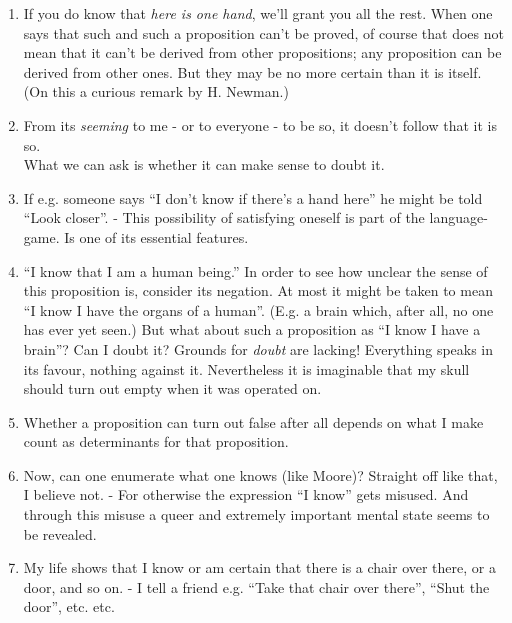 \documentclass{book}
\begin{document}
\mainmatter

\begin{enumerate}

\item
If you do know that \emph{here is one hand}, we'll grant you all the rest.
When one says that such and such a proposition can't be proved, of course that
does not mean that it can't be derived from other propositions; any proposition
can be derived from other ones. But they may be no more certain than it is
itself. (On this a curious remark by H. Newman.)

\item
From its \emph{seeming} to me - or to everyone - to be so, it doesn't follow
that it is so. \\
What we can ask is whether it can make sense to doubt it.

\item
If e.g. someone says ``I don't know if there's a hand here'' he might be told
``Look closer''. - This possibility of satisfying oneself is part of the
language-game. Is one of its essential features.

\item
``I know that I am a human being.'' In order to see how unclear the sense of
this proposition is, consider its negation. At most it might be taken to mean
``I know I have the organs of a human''. (E.g. a brain which, after all, no one
has ever yet seen.) But what about such a proposition as ``I know I have a
brain''? Can I doubt it? Grounds for \emph{doubt} are lacking! Everything
speaks in its favour, nothing against it. Nevertheless it is imaginable that my
skull should turn out empty when it was operated on.

\item
Whether a proposition can turn out false after all depends on what I make count
as determinants for that proposition.

\item
Now, can one enumerate what one knows (like Moore)? Straight off like that, I
believe not. - For otherwise the expression ``I know'' gets misused. And
through this misuse a queer and extremely important mental state seems to be
revealed.

\item
My life shows that I know or am certain that there is a chair over there, or a
door, and so on. - I tell a friend e.g. ``Take that chair over there'', ``Shut
the door'', etc. etc.


\end{enumerate}
\end{document}
